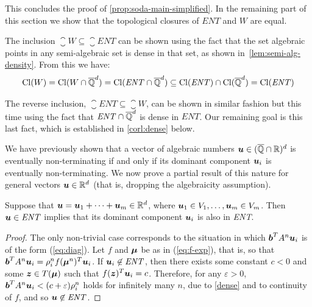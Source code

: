 This concludes the proof of \cref{prop:soda-main-simplified}.
In the remaining part of this section we show that the topological closures of
$\mathit{ENT}$ and $W$ are equal.

The inclusion $\closure{W}\subseteq \closure{ENT}$ can be shown
using the fact that the set algebraic points in any semi-algebraic set
is dense in that set, as shown in~\cref{lem:semi-alg-density}.  From
this we have:
\begin{align*}
\operatorname{Cl}(W)=\operatorname{Cl}(W\cap\overline{\mathbb{Q}}^{d})=\operatorname{Cl}(\mathit{ENT}\cap\overline{\mathbb{Q}}^{d}) \subseteq \operatorname{Cl}(\mathit{ENT})\cap\operatorname{Cl}(\overline{\mathbb{Q}}^{d})=\operatorname{Cl}(\mathit{ENT})
\end{align*}

The reverse inclusion, $\closure{ENT}\subseteq\closure{W}$, can be
shown in similar fashion but this time using the fact that
$\mathit{ENT}\cap\overline{\mathbb{Q}}^{d}$ is dense in $\mathit{ENT}$.  Our
remaining goal is this last fact, which is established in
\cref{corl:dense} below.

We have previously shown that a vector of algebraic numbers $\boldsymbol{u}\in (\overline{\mathbb{Q}}\cap\mathbb{R})^{d}$ is eventually non-terminating if and only if its dominant component $\boldsymbol{u}_i$ is eventually non-terminating. We now prove a partial result of this nature for general vectors $\boldsymbol{u} \in \mathbb{R}^{d}$ (that is, dropping the algebraicity assumption).

\begin{proposition}
  Suppose that $\boldsymbol u=\boldsymbol u_1+\cdots+\boldsymbol
  u_m\in \mathbb{R}^{d}$, where $\boldsymbol u_1\in
  V_1,\ldots,\boldsymbol u_m\in V_m$. Then $\boldsymbol
  u\in\mathit{ENT}$ implies that its dominant component $\boldsymbol
  u_i$ is also in \textit{ENT}.
\label{prop:dom2}
\end{proposition}
\begin{proof}
  The only non-trivial case corresponds to the situation in which
  $\boldsymbol b^T A^n \boldsymbol u_i$ is of the form (\ref{eq:diag}).
  Let $f$ and $\boldsymbol \mu$ be as in (\ref{eq:f-exp}), that is, so
  that $\boldsymbol b^T A^n \boldsymbol u_i=\rho_i^n f (\boldsymbol
  \mu^n)^T \boldsymbol u_i$. If $\boldsymbol u_i\not\in\mathit{ENT}$,
  then there exists some constant $c<0$ and some $\boldsymbol z\in T(\boldsymbol \mu)$ such that $f(\boldsymbol z)^T \boldsymbol u_i=c$. Therefore, for any $\varepsilon>0$, $\boldsymbol b^T A^n \boldsymbol u_i<(c+\varepsilon)\rho_i^n$ holds for infinitely many $n$, due to \cref{dense} and to continuity of $f$, and so $\boldsymbol u\not\in\mathit{ENT}$.
\end{proof}

